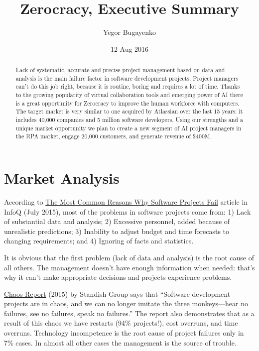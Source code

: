\documentclass[12pt]{article}
\title{Zerocracy, Executive Summary}
\author{Yegor Bugayenko}
\date{12 Aug 2016}
\begin{document}
\setlength{\topskip}{0mm}
\setlength{\parindent}{0pt}
\setlength{\parskip}{8pt}
\maketitle

\begin{abstract}
Lack of systematic, accurate and precise project management based on data and
analysis is the main failure factor in software development projects. Project
managers can't do this job right, because it is routine, boring and requires a
lot of time. Thanks to the growing popularity of virtual collaboration tools and
emerging power of AI there is a great opportunity for Zerocracy to improve the
human workforce with computers. The target market is very similar to one
acquired by Atlassian over the last 15 years: it includes 40,000 companies and 5
million software developers. Using our strengths and a unique market opportunity
we plan to create a new segment of AI project managers in the RPA market, engage
20,000 customers, and generate revenue of \$400M.
\end{abstract}

\section{Market Analysis}

According to
\href{https://www.infoq.com/articles/software-failure-reasons}{The Most Common Reasons Why Software Projects Fail}
article in InfoQ
(July 2015), most of the problems in software projects come from: 1) Lack of
substantial data and analysis; 2) Excessive personnel, added because of
unrealistic predictions; 3) Inability to adjust budget and time forecasts to
changing requirements; and 4) Ignoring of facts and statistics.

It is obvious that the first problem (lack of data and analysis) is the root
cause of all others. The management doesn't have enough information when needed:
that's why it can't make appropriate decisions and projects experience problems.

\href{https://www.projectsmart.co.uk/white-papers/chaos-report.pdf}{Chaos Report} (2015)
by Standish Group says that ``Software development projects
are in chaos, and we can no longer imitate the three monkeys---hear no failures,
see no failures, speak no failures.'' The report also demonstrates that as a
result of this chaos we have restarts (94\% projects!), cost overruns, and time
overruns. Technology incompetence is the root cause of project failures only in
7\% cases. In almost all other cases the management is the source of trouble.
\end{document}
